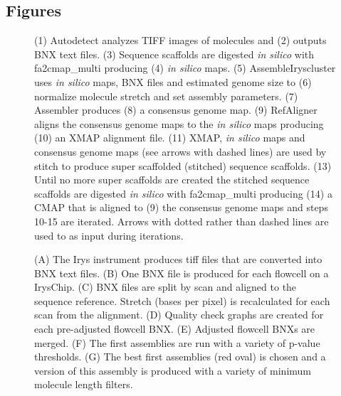 \documentclass{bmcart}
\begin{document}
\begin{backmatter}
\section*{Figures}
  \begin{figure}[h!]
  	\caption{
  		(1) Autodetect analyzes TIFF images of molecules and (2) outputs BNX text files. (3) Sequence scaffolds are digested \textit{in silico} with fa2cmap\_multi producing (4) \textit{in silico} maps. (5) AssembleIryscluster uses \textit{in silico} maps, BNX files and estimated genome size to (6) normalize molecule stretch and set assembly parameters. (7) Assembler produces (8) a consensus genome map. (9) RefAligner aligns the consensus genome maps to the \textit{in silico} maps producing (10) an XMAP alignment file. (11) XMAP, \textit{in silico} maps and consensus genome maps (see arrows with dashed lines) are used by stitch to produce super scaffolded (stitched) sequence scaffolds. (13) Until no more super scaffolds are created the stitched sequence scaffolds are digested \textit{in silico} with fa2cmap\_multi producing (14) a CMAP that is aligned to (9) the consensus genome maps and steps 10-15 are iterated. Arrows with dotted rather than dashed lines are used to as input during iterations.}
  \end{figure}
  \begin{figure}[h!]
  	\caption{
  		(A) The Irys instrument produces tiff files that are converted into BNX text files. (B) One BNX file is produced for each flowcell on a IrysChip. (C) BNX files are split by scan and aligned to the sequence reference. Stretch (bases per pixel) is recalculated for each scan from the alignment. (D) Quality check graphs are created for each pre-adjusted flowcell BNX. (E) Adjusted flowcell BNXs are merged. (F) The first assemblies are run with a variety of p-value thresholds. (G) The best first assemblies (red oval) is chosen and a version of this assembly is produced with a variety of minimum molecule length filters.}
  \end{figure}
  \begin{figure}[h!]
  \caption{
}
\end{figure}
\end{backmatter}
\end{document}
